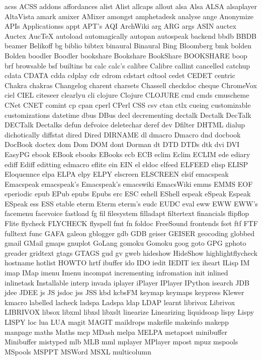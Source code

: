 acss
ACSS
addons
affordances
alist
Alist
allcaps
allout
alsa
Alsa
ALSA
alsaplayer
AltaVista
amark
amixer
AMixer
amongst
amphetadesk
analyse
ange
Anonymize
APIs
Applicationss
appt
APT's
AQI
ArchWiki
arg
ARG
args
ASIN
auctex
Auctex
AucTeX
autoload
automagically
autopan
autospeak
backend
bbdb
BBDB
beamer
Belikoff
bg
biblio
bibtex
binaural
Binaural
Bing
Bloomberg
bmk
bolden
Bolden
boodler
Boodler
bookshare
Bookshare
BookShare
BOOKSHARE
boop
brf
browsable
bsf
builtins
bz
calc
calc's
calibre
Calibre
callint
cancelled
catchup
cdata
CDATA
cdda
cdplay
cdr
cdrom
cdstart
cdtool
cedet
CEDET
centric
Chakra
chakras
Changelog
charent
charsets
Chassell
checkdoc
cheque
ChromeVox
ciel
CIEL
citeseer
clearlyu
cli
clojure
Clojure
CLOJURE
cmd
cmds
cmuscheme
CNet
CNET
comint
cp
cpan
cperl
CPerl
CSS
csv
ctan
ctlx
cueing
customizable
customizations
datetime
dbus
DBus
decl
decrementing
dectalk
Dectalk
DecTalk
DECTalk
Dectalks
defun
defvoice
deletechar
deref
dev
Dfilter
DHTML
dialup
dichotically
diffstat
dired
Dired
DIRNAME
dl
dmacro
Dmacro
dnd
docbook
DocBook
doctex
dom
Dom
DOM
dont
Dorman
dt
DTD
DTDs
dtk
dvi
DVI
EasyPG
ebook
EBook
ebooks
EBooks
ecb
ECB
eclim
Eclim
ECLIM
ede
ediary
ediff
Ediff
editting
edmacro
eflite
ein
EIN
el
eldoc
elfeed
ELFEED
elisp
ELISP
Eloquennce
elpa
ELPA
elpy
ELPY
elscreen
ELSCREEN
elsif
emacspeak
Emacspeak
emacspeak's
Emacspeak's
emacswiki
EmacsWiki
emms
EMMS
EOF
eperiodic
epub
EPub
epubs
Epubs
erc
ESC
eshell
EShell
espeak
eSpeak
Espeak
ESpeak
ess
ESS
etable
eterm
Eterm
eterm's
eudc
EUDC
eval
eww
EWW
EWW's
facemenu
facevoice
fastload
fg
fil
filesystem
filladapt
filtertext
financials
flipflop
Flite
flycheck
FLYCHECK
flyspell
fmt
fn
foldoc
FreeSound
frontends
fset
ftf
FTF
fulltext
func
GAFA
galeon
gblogger
gdb
GDB
geiser
GEISER
geocoding
globbed
gmail
GMail
gmaps
gnuplot
GoLang
gomoku
Gomoku
goog
goto
GPG
gphoto
greader
gridtext
gtags
GTAGS
gud
gv
gweb
hideshow
HideShow
highlightflycheck
hostname
hotlist
HOWTO
hrtf
ibuffer
ido
IDO
iedit
IEDIT
iex
iheart
ILisp
IM
imap
IMap
imenu
Imenu
incompat
incrementing
infromation
init
inlined
inlinetask
Installable
interp
invada
iplayer
iPlayer
IPlayer
IPython
isearch
JDB
jdee
JDEE
js
JS
jsdoc
jss
JSS
kbd
kcbsFM
keymap
keymaps
keypress
Klewer
kmacro
labelled
lacheck
ladspa
Ladspa
ldap
LDAP
learnt
librivox
Librivox
LIBRIVOX
libsox
libxml
libxsl
libxslt
linearize
Linearizing
liquidsoap
lispy
Lispy
LISPY
loc
lua
LUA
magit
MAGIT
maildrops
makefile
makeinfo
makepp
manpage
maths
Maths
mcp
MDash
melpa
MELPA
metapost
minibuffer
Minibuffer
mistyped
mlb
MLB
mml
mplayer
MPlayer
mpost
mpuz
mspools
MSpools
MSPPT
MSWord
MSXL
multicolumn
